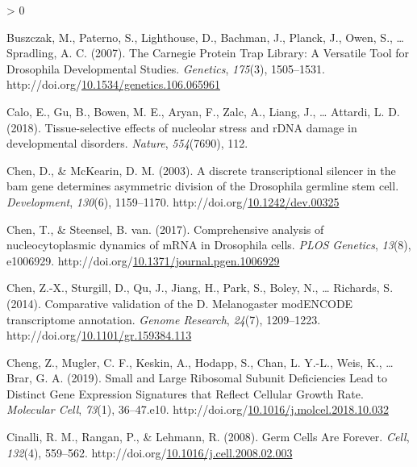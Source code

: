 \documentclass[12pt,oneside]{reedthesis}
\newlength{\cslhangindent}
\newenvironment{CSLReferences}[2] %
 {%
  \setlength{\parindent}{0pt}
  \ifodd #1 \everypar{\setlength{\hangindent}{\cslhangindent}}\ignorespaces\fi
  \ifnum #2 > 0
  \setlength{\parskip}{#2\baselineskip}
  \fi
 }%
 {}
\begin{document}
\begin{CSLReferences}{1}{0}
\leavevmode\hypertarget{ref-buszczakCarnegieProteinTrap2007}{}%
Buszczak, M., Paterno, S., Lighthouse, D., Bachman, J., Planck, J., Owen, S., \ldots{} Spradling, A. C. (2007). The {Carnegie Protein Trap Library}: {A Versatile Tool} for {Drosophila Developmental Studies}. \emph{Genetics}, \emph{175}(3), 1505--1531. http://doi.org/\href{https://doi.org/10.1534/genetics.106.065961}{10.1534/genetics.106.065961}

\leavevmode\hypertarget{ref-Calo2018a}{}%
Calo, E., Gu, B., Bowen, M. E., Aryan, F., Zalc, A., Liang, J., \ldots{} Attardi, L. D. (2018). Tissue-selective effects of nucleolar stress and {rDNA} damage in developmental disorders. \emph{Nature}, \emph{554}(7690), 112.

\leavevmode\hypertarget{ref-Chen2003q}{}%
Chen, D., \& McKearin, D. M. (2003). A discrete transcriptional silencer in the bam gene determines asymmetric division of the {Drosophila} germline stem cell. \emph{Development}, \emph{130}(6), 1159--1170. http://doi.org/\href{https://doi.org/10.1242/dev.00325}{10.1242/dev.00325}

\leavevmode\hypertarget{ref-chenComprehensiveAnalysisNucleocytoplasmic2017}{}%
Chen, T., \& Steensel, B. van. (2017). Comprehensive analysis of nucleocytoplasmic dynamics of {mRNA} in {Drosophila} cells. \emph{PLOS Genetics}, \emph{13}(8), e1006929. http://doi.org/\href{https://doi.org/10.1371/journal.pgen.1006929}{10.1371/journal.pgen.1006929}

\leavevmode\hypertarget{ref-chenComparativeValidationMelanogaster2014}{}%
Chen, Z.-X., Sturgill, D., Qu, J., Jiang, H., Park, S., Boley, N., \ldots{} Richards, S. (2014). Comparative validation of the {D}. Melanogaster {modENCODE} transcriptome annotation. \emph{Genome Research}, \emph{24}(7), 1209--1223. http://doi.org/\href{https://doi.org/10.1101/gr.159384.113}{10.1101/gr.159384.113}

\leavevmode\hypertarget{ref-chengSmallLargeRibosomal2019}{}%
Cheng, Z., Mugler, C. F., Keskin, A., Hodapp, S., Chan, L. Y.-L., Weis, K., \ldots{} Brar, G. A. (2019). Small and {Large Ribosomal Subunit Deficiencies Lead} to {Distinct Gene Expression Signatures} that {Reflect Cellular Growth Rate}. \emph{Molecular Cell}, \emph{73}(1), 36--47.e10. http://doi.org/\href{https://doi.org/10.1016/j.molcel.2018.10.032}{10.1016/j.molcel.2018.10.032}

\leavevmode\hypertarget{ref-Cinalli2008d}{}%
Cinalli, R. M., Rangan, P., \& Lehmann, R. (2008). Germ {Cells Are Forever}. \emph{Cell}, \emph{132}(4), 559--562. http://doi.org/\href{https://doi.org/10.1016/j.cell.2008.02.003}{10.1016/j.cell.2008.02.003}


\end{CSLReferences}
\end{document}
